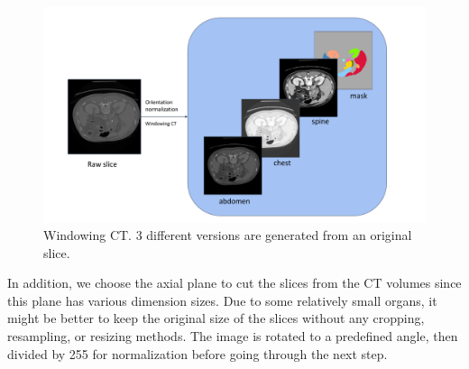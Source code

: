 \begin{figure}[!h]
    \centering
    \includegraphics[width=\textwidth]{resources/new_images/preproc.pdf}
    \caption{Windowing CT. 3 different versions are generated from an original slice. }
    \label{fig:windowingct}
\end{figure}

In addition, we choose the axial plane to cut the slices from the CT volumes since this plane has various dimension sizes. 
Due to some relatively small organs, it might be better to keep the original size of the slices without any cropping, resampling, or resizing methods.
The image is rotated to a predefined angle, then divided by 255 for normalization before going through the next step.
\pagebreak